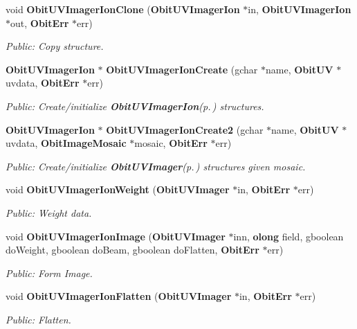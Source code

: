 \begin{CompactItemize}
void {\bf Obit\-UVImager\-Ion\-Clone} ({\bf Obit\-UVImager\-Ion} $\ast$in, {\bf Obit\-UVImager\-Ion} $\ast$out, {\bf Obit\-Err} $\ast$err)
\begin{CompactList}\small\item\em Public: Copy structure. \item\end{CompactList}\item 
{\bf Obit\-UVImager\-Ion} $\ast$ {\bf Obit\-UVImager\-Ion\-Create} (gchar $\ast$name, {\bf Obit\-UV} $\ast$uvdata, {\bf Obit\-Err} $\ast$err)
\begin{CompactList}\small\item\em Public: Create/initialize {\bf Obit\-UVImager\-Ion}{\rm (p.\,\pageref{structObitUVImagerIon})} structures. \item\end{CompactList}\item 
{\bf Obit\-UVImager\-Ion} $\ast$ {\bf Obit\-UVImager\-Ion\-Create2} (gchar $\ast$name, {\bf Obit\-UV} $\ast$uvdata, {\bf Obit\-Image\-Mosaic} $\ast$mosaic, {\bf Obit\-Err} $\ast$err)
\begin{CompactList}\small\item\em Public: Create/initialize {\bf Obit\-UVImager}{\rm (p.\,\pageref{structObitUVImager})} structures given mosaic. \item\end{CompactList}\item 
void {\bf Obit\-UVImager\-Ion\-Weight} ({\bf Obit\-UVImager} $\ast$in, {\bf Obit\-Err} $\ast$err)
\begin{CompactList}\small\item\em Public: Weight data. \item\end{CompactList}\item 
void {\bf Obit\-UVImager\-Ion\-Image} ({\bf Obit\-UVImager} $\ast$inn, {\bf olong} field, gboolean do\-Weight, gboolean do\-Beam, gboolean do\-Flatten, {\bf Obit\-Err} $\ast$err)
\begin{CompactList}\small\item\em Public: Form Image. \item\end{CompactList}\item 
void {\bf Obit\-UVImager\-Ion\-Flatten} ({\bf Obit\-UVImager} $\ast$in, {\bf Obit\-Err} $\ast$err)
\begin{CompactList}\small\item\em Public: Flatten. \item\end{CompactList}\item 

\end{CompactItemize}
